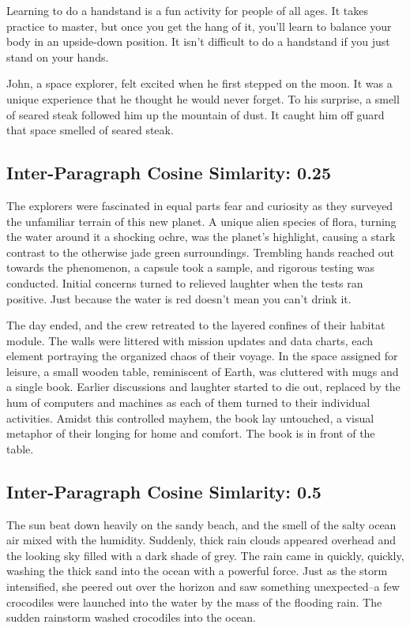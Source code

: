 \documentclass[11pt]{article}
\begin{document}
Learning to do a handstand is a fun activity for people of all ages. It takes practice to master, but once you get the hang of it, you'll learn to balance your body in an upside-down position. It isn't difficult to do a handstand if you just stand on your hands.

John, a space explorer, felt excited when he first stepped on the moon. It was a unique experience that he thought he would never forget. To his surprise, a smell of seared steak followed him up the mountain of dust. It caught him off guard that space smelled of seared steak.

\subsection*{Inter-Paragraph Cosine Simlarity: 0.25} %

The explorers were fascinated in equal parts fear and curiosity as they surveyed the unfamiliar terrain of this new planet. A unique alien species of flora, turning the water around it a shocking ochre, was the planet's highlight, causing a stark contrast to the otherwise jade green surroundings. Trembling hands reached out towards the phenomenon, a capsule took a sample, and rigorous testing was conducted. Initial concerns turned to relieved laughter when the tests ran positive. Just because the water is red doesn't mean you can't drink it.

The day ended, and the crew retreated to the layered confines of their habitat module. The walls were littered with mission updates and data charts, each element portraying the organized chaos of their voyage. In the space assigned for leisure, a small wooden table, reminiscent of Earth, was cluttered with mugs and a single book. Earlier discussions and laughter started to die out, replaced by the hum of computers and machines as each of them turned to their individual activities. Amidst this controlled mayhem, the book lay untouched, a visual metaphor of their longing for home and comfort. The book is in front of the table.

\subsection*{Inter-Paragraph Cosine Simlarity: 0.5} %

The sun beat down heavily on the sandy beach, and the smell of the salty ocean air mixed with the humidity. Suddenly, thick rain clouds appeared overhead and the looking sky filled with a dark shade of grey. The rain came in quickly, quickly, washing the thick sand into the ocean with a powerful force. Just as the storm intensified, she peered out over the horizon and saw something unexpected--a few crocodiles were launched into the water by the mass of the flooding rain. The sudden rainstorm washed crocodiles into the ocean.
\end{document}

